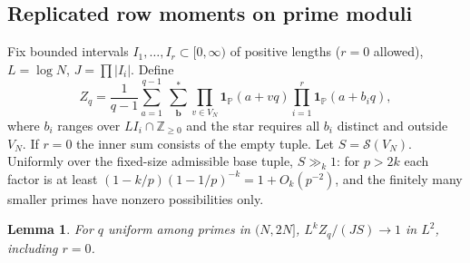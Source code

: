 \documentclass[11pt]{article}
\newtheorem{lemma}{Lemma}
\newcommand{\1}{\mathbf{1}}
\newcommand{\Sg}{\mathcal S}
\begin{document}
\subsection{Replicated row moments on prime moduli}
Fix bounded intervals $I_1,\ldots,I_r\subset[0,\infty)$ of positive lengths ($r=0$ allowed), $L=\log N$, $J=\prod |I_i|$. Define
\[
 Z_q=\frac1{q-1}\sum_{a=1}^{q-1}\ \sum_{\mathbf b}^{*}
       \prod_{v\in V_N}\1_{\mathbb P}(a+vq)\prod_{i=1}^r\1_{\mathbb P}(a+b_iq),
\]
where $b_i$ ranges over $L I_i\cap\mathbb Z_{\ge0}$ and the star requires all $b_i$ distinct and outside $V_N$. If $r=0$ the inner sum consists of the empty tuple. Let $S=\Sg(V_N)$. Uniformly over the fixed-size admissible base tuple, $S\gg_k1$: for $p>2k$ each factor is at least $(1-k/p)(1-1/p)^{-k}=1+O_k(p^{-2})$, and the finitely many smaller primes have nonzero possibilities only.
\begin{lemma}\label{lem:prime}
For $q$ uniform among primes in $(N,2N]$, $L^k Z_q/(J S)\to1$ in $L^2$, including $r=0$.
\end{lemma}
\end{document}
